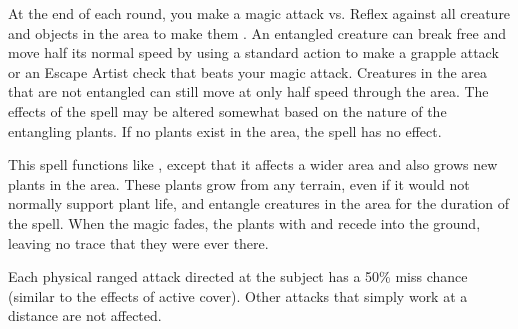 \spelldur{\durshort \dismissable}
\spelleffect At the end of each round, you make a magic attack vs. Reflex against all creature and objects in the area to make them \entangled. An entangled creature can break free and move half its normal speed by using a standard action to make a grapple attack or an Escape Artist check that beats your magic attack. Creatures in the area that are not entangled can still move at only half speed through the area.
\spellnotes The effects of the spell may be altered somewhat based on the nature of the entangling plants. If no plants exist in the area, the spell has no effect.

\spelleffect This spell functions like , except that it affects a wider area and also grows new plants in the area. These plants grow from any terrain, even if it would not normally support plant life, and entangle creatures in the area for the duration of the spell. When the magic fades, the plants with and recede into the ground, leaving no trace that they were ever there.

\spelldur{\durshort \dismissable}
\spelleffect Each physical ranged attack directed at the subject has a 50\% miss chance (similar to the effects of active cover). Other attacks that simply work at a distance are not affected.


